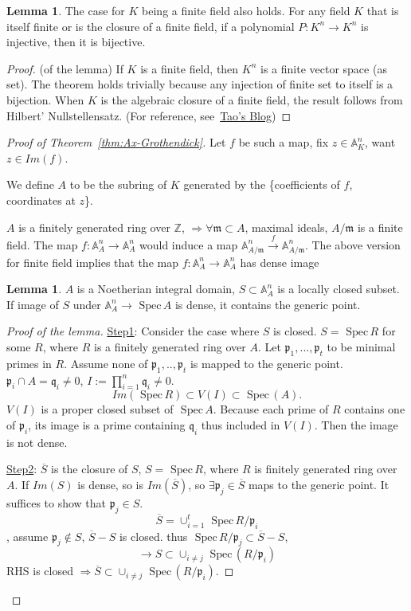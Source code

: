 \documentclass[11pt]{article}
\theoremstyle{definition}
\newtheorem{lemma}[thm]{Lemma}
\newcommand{\spec}{\text{ Spec}\,}
\newcommand{\affn}{\mathbb A}
\newcommand{\intg}{\mathbb Z}
\newcommand{\scm}{{\mathfrak m}}
\newcommand{\scp}{{\mathfrak p}}
\newcommand{\scq}{\mathfrak q}
\newcommand{\Lrta}{\Longrightarrow}
\newcommand{\lrta}{\longrightarrow}
\begin{document}
\begin{lemma}
The case for $K$ being a finite field also holds. For any field $K$ that is itself finite or is the closure of a finite field, if a polynomial $P: K^n\lrta K^n$ is injective, then it is bijective.
\end{lemma}
\begin{proof}(of the lemma)
If $K$ is a finite field, then $K^n$ is a finite vector space (as set). The theorem holds trivially because any injection of finite set to itself is a bijection. When $K$ is  the algebraic closure of a finite field, the result follows from Hilbert' Nullstellensatz. (For reference, see~\href{https://terrytao.wordpress.com/2009/03/07/infinite-fields-finite-fields-and-the-ax-grothendieck-theorem/}{Tao's Blog})
\end{proof}
\begin{proof}[Proof of Theorem~\ref{thm:Ax-Grothendick}]
Let $f$ be such a map, fix $z\in \affn^n_K$, want $z\in Im(f)$.

We define $A$ to be the subring of $K$ generated by the \{coefficients of $f$,  coordinates at $z$\}. 

$A$ is a finitely generated ring over $\intg$, $\Lrta \forall \scm\subset A$, maximal ideals, $A/\scm$ is a finite field. The map $f:\affn^n_A\lrta\affn^n_A$ would induce  a map $\affn^n_{A/\scm}\overset{f}{\lrta}\affn^n_{A/\scm}$.
{\color{red} The above version for finite field implies that the map $f:\affn^n_A\lrta\affn^n_A$ has dense image}
\begin{lemma}
$A$ is a Noetherian integral domain, $S\subset \affn^n_{A}$ is a locally closed subset. If  image of $S$ under $\affn^n_A\lrta \spec A$ is dense, it contains the generic point.
\end{lemma}
\begin{proof}[Proof of the lemma]
\underline{Step1}: Consider the case where  $S$ is closed. $S=\spec R$ for some $R$, where $R$ is a finitely generated ring over $A$. Let $\scp_1,...,\scp_t$ to be minimal primes in $R$. Assume none of $\scp_1,..,\scp_t$ is mapped to the generic point. $\scp_i\cap A=\scq_i\neq 0$, $I:=\prod_{i=1}^{n}\scq_i\neq 0$.
$$
Im(\spec R)\subset V(I)\subset \spec (A).
$$
$V(I)$ is a proper closed subset of $\spec A$. Because each prime of $R$ contains one of $\scp_i$, its image is a prime containing $\scq_i$ thus included in $V(I)$. Then the image is not dense. 

\underline{Step2}: $\overline{S}$ is the closure of $S$, $S=\spec R$, where $R$ is finitely generated ring over $A$. If $Im(S)$ is dense, so is  $Im(\overline{S})$, so $\exists \scp_j\in \overline{S}$ maps to the generic point. It suffices to show that $\scp_j\in S$.
$$
\overline{S}=\cup^t_{i=1}\spec R/\scp_i
$$, assume $\scp_j\notin S$, $\overline{S}-S$ is closed. thus $\spec R/\scp_j\subset \overline{S}-S$,
 $$
\lrta S\subset \cup_{i\neq j}\spec (R/\scp_i)
$$
RHS is closed $\Lrta \overline{S}\subset \cup_{i\neq j}\spec (R/\scp_i)$.


\end{proof}
\end{proof}
\end{document}
